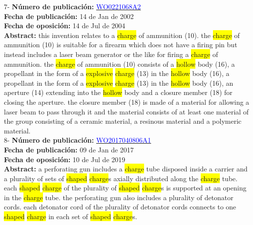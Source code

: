  \vspace{1cm}7- \textbf{Número de publicación:} \href{https://worldwide.espacenet.com/publicationDetails/biblio?DB=EPODOC&II=0&ND=3&adjacent=true&locale=en_EP&FT=D&date=20160331&CC=WO&NR=0221068A2&KC=#}{\textcolor{blue}{WO0221068A2}}\\ 
\textbf{Fecha de publicación:} 14 de Jan de 2002\\ 
\textbf{Fecha de oposición:} 14 de Jul de 2004\\ 
\textbf{Abstract:} this invention relates to a \colorbox{yellow}{\colorbox{yellow}{charge}} of ammunition (10). the \colorbox{yellow}{\colorbox{yellow}{charge}} of ammunition (10) is suitable for a firearm which does not have a firing pin but instead includes a laser beam generator or the like for firing a \colorbox{yellow}{\colorbox{yellow}{charge}} of ammunition. the \colorbox{yellow}{\colorbox{yellow}{charge}} of ammunition (10) consists of a \colorbox{yellow}{\colorbox{yellow}{hollow}} body (16), a propellant in the form of a \colorbox{yellow}{explosive} \colorbox{yellow}{\colorbox{yellow}{charge}} (13) in the \colorbox{yellow}{\colorbox{yellow}{hollow}} body (16), a propellant in the form of a \colorbox{yellow}{explosive} \colorbox{yellow}{\colorbox{yellow}{charge}} (13) in the \colorbox{yellow}{\colorbox{yellow}{hollow}} body (16), an aperture (14) extending into the \colorbox{yellow}{\colorbox{yellow}{hollow}} body and a closure member (18) for closing the aperture. the closure member (18) is made of a material for allowing a laser beam to pass through it and the material consists of at least one material of the group consisting of a ceramic material, a resinous material and a polymeric material.\\ 
 

 \vspace{1cm}8- \textbf{Número de publicación:} \href{https://worldwide.espacenet.com/publicationDetails/biblio?DB=EPODOC&II=0&ND=3&adjacent=true&locale=en_EP&FT=D&date=20160331&CC=WO&NR=2017040806A1&KC=A1#}{\textcolor{blue}{WO2017040806A1}}\\ 
\textbf{Fecha de publicación:} 09 de Jan de 2017\\ 
\textbf{Fecha de oposición:} 10 de Jul de 2019\\ 
\textbf{Abstract:} a perforating gun includes a \colorbox{yellow}{\colorbox{yellow}{charge}} tube disposed inside a carrier and a plurality of sets of \colorbox{yellow}{shaped} \colorbox{yellow}{\colorbox{yellow}{charge}}s axially distributed along the \colorbox{yellow}{\colorbox{yellow}{charge}} tube. each \colorbox{yellow}{shaped} \colorbox{yellow}{\colorbox{yellow}{charge}} of the plurality of \colorbox{yellow}{shaped} \colorbox{yellow}{\colorbox{yellow}{charge}}s is supported at an opening in the \colorbox{yellow}{\colorbox{yellow}{charge}} tube. the perforating gun also includes a plurality of detonator cords. each detonator cord of the plurality of detonator cords connects to one \colorbox{yellow}{shaped} \colorbox{yellow}{\colorbox{yellow}{charge}} in each set of \colorbox{yellow}{shaped} \colorbox{yellow}{\colorbox{yellow}{charge}}s.\\ 
 

